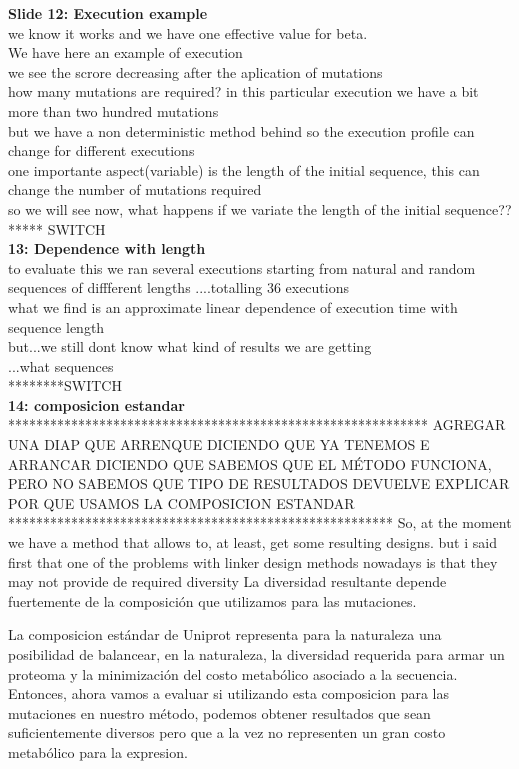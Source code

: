 \documentclass[a4paper,10pt]{article}
\begin{document}
\textbf{Slide 12: Execution example}\\
we know it works and we have one effective value for beta.\\
We have here an example of execution\\
we see the scrore decreasing after the aplication of mutations\\
how many mutations are required? in this particular execution we have a bit more than two hundred mutations\\ 
but we have a non deterministic method behind so the execution profile can change for different executions\\
one importante aspect(variable) is the length of the initial sequence, this can change the number of mutations required\\
so we will see now, what happens if we variate the length of the initial sequence?? ***** SWITCH\\


\textbf{13: Dependence with length}\\
to evaluate this we ran several executions starting from natural and random sequences of diffferent lengths ....totalling 36 executions\\
what we find is an approximate linear dependence of execution time with sequence length\\
but...we still dont know what kind of results we are getting\\
...what sequences\\
********SWITCH\\




\textbf{14: composicion estandar}
************************************************************
AGREGAR UNA DIAP QUE ARRENQUE DICIENDO QUE YA TENEMOS E
ARRANCAR DICIENDO QUE SABEMOS QUE EL MÉTODO FUNCIONA, PERO NO SABEMOS QUE TIPO DE RESULTADOS DEVUELVE
EXPLICAR POR QUE USAMOS LA COMPOSICION ESTANDAR
*******************************************************
So, at the moment we have a method that allows to, at least, get some resulting designs.
but i said first that one of the problems with linker design methods nowadays is that they may not provide de required diversity
La diversidad resultante depende fuertemente de la composición que utilizamos para las mutaciones.


La composicion estándar de Uniprot representa para la naturaleza una posibilidad de balancear, en la naturaleza, la diversidad requerida para armar un proteoma y la minimización del costo metabólico asociado a la secuencia.
Entonces, ahora vamos a evaluar si utilizando esta composicion para las mutaciones en nuestro método, 
podemos obtener resultados que sean suficientemente diversos pero que a la vez no representen un gran costo metabólico para la expresion.
\end{document}
